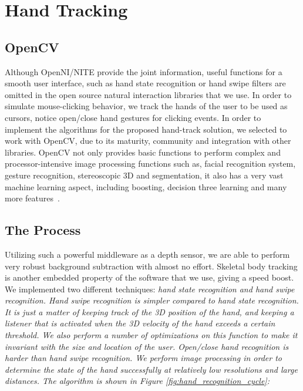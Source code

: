 \chapter{Hand Tracking}
\label{appendix_hand_tracking}

\section{OpenCV}
 
Although OpenNI/NITE provide the joint information, useful functions for a smooth user interface, such as hand state recognition or hand swipe filters are omitted in the open source natural interaction libraries that we use. In order to simulate mouse-clicking behavior, we track the hands of the user to be used as cursors, notice open/close hand gestures for clicking events. In order to implement the algorithms for the proposed hand-track solution, we selected to work with OpenCV, due to its maturity, community and integration with other libraries. OpenCV not only provides basic functions to perform complex and processor-intensive image processing functions such as, facial recognition system, gesture recognition, stereoscopic 3D and segmentation, it also has a very vast machine learning aspect, including boosting, decision three learning and many more features~\cite{opencv_library}.

\section{The Process}

Utilizing such a powerful middleware as a depth sensor, we are able to perform very robust background subtraction with almost no effort. Skeletal body tracking is another embedded property of the software that we use, giving a speed boost. We implemented two different techniques: \em{hand state recognition} and \em{hand swipe recognition}. Hand swipe recognition is simpler compared to hand state recognition. It is just a matter of keeping track of the 3D position of the hand, and keeping a listener that is activated when the 3D velocity of the hand exceeds a certain threshold. We also perform a number of optimizations on this function to make it invariant with the size and location of the user. Open/close hand recognition is harder than hand swipe recognition. We perform image processing in order to determine the state of the hand successfully at relatively low resolutions and large distances. The algorithm is shown in Figure \ref{fig:hand_recognition_cycle}:

